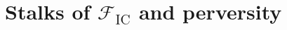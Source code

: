 \documentclass[letterpaper,11pt]{amsart}
\begin{document}

\section{Stalks of \texorpdfstring{$\mathcal{F}_\mathrm{IC}$ and perversity}{}}\label{sec: Stalks}
\end{document}
